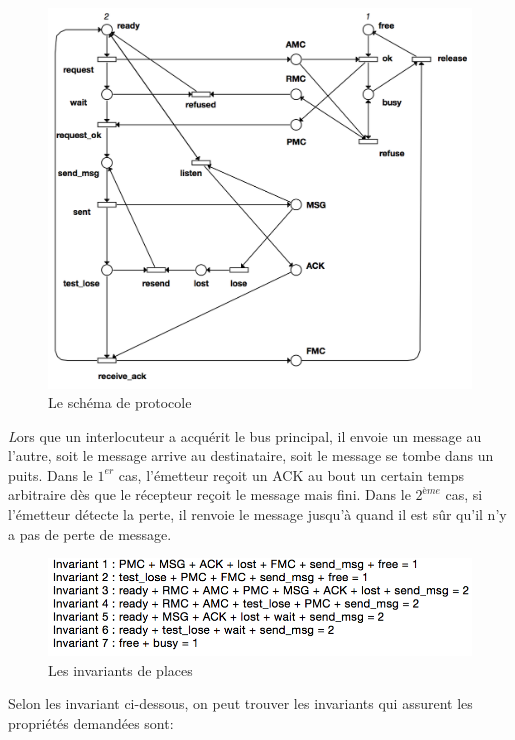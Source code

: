 \documentclass[a4paper,11pt]{report}
\begin{document}
	\begin{figure}[!htbp]
		\centering
		\includegraphics[width = 15cm]{protocole1.png}
		\caption{Le schéma de protocole}
	\end{figure}
	
	{\huge \itshape L}ors que un interlocuteur a acquérit le bus principal, il envoie un message au l'autre, soit le message arrive au destinataire, soit le message se tombe dans un puits. Dans le $1^{er}$ cas, l'émetteur reçoit un ACK au bout un certain temps arbitraire dès que le récepteur reçoit le message mais fini. Dans le $2^{ème}$ cas, si l'émetteur détecte la perte, il renvoie le message jusqu'à quand il est sûr qu'il n'y a pas de perte de message.
	
	\begin{figure}[!htbp]
		\centering
		\includegraphics[width = 15cm]{place_invariant.png}
		\caption{Les invariants de places}
	\end{figure}
	
	Selon les invariant ci-dessous, on peut trouver les invariants qui assurent les propriétés demandées sont:
	
\end{document}
